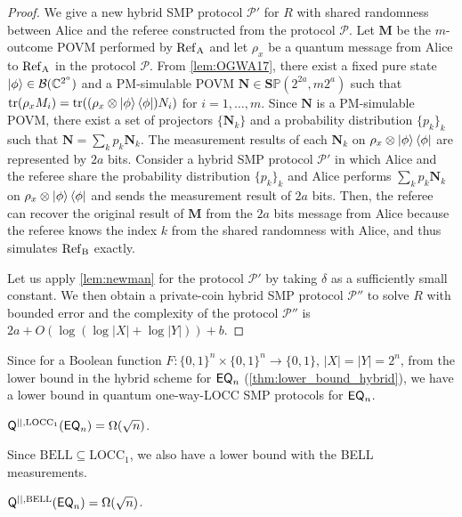 \begin{proof}
    We give a new hybrid SMP protocol $\mathcal{P}'$ for $R$ with shared randomness between Alice and the referee constructed from the protocol $\mathcal{P}$. Let $\mathbf{M}$ be the $m$-outcome POVM performed by $\rm{Ref}_A$ and let $\rho_x$ be a quantum message from Alice to $\rm{Ref}_A$ in the protocol $\mathcal{P}$. From \cref{lem:OGWA17}, there exist a fixed pure state $\ket{\phi} \in \mathcal{B}(\mathbb{C}^{2^a})$ and a PM-simulable POVM $\mathbf{N} \in \mathbf{S}\mathbb{P}(2^{2a},m 2^a)$ such that $\mathrm{tr}(\rho_x M_i) = \mathrm{tr}((\rho_x \otimes \ket{\phi} \bra{\phi}) N_i)$ for $i=1,\ldots,m$. Since $\mathbf{N}$ is a PM-simulable POVM, there exist a set of projectors $\{\mathbf{N}_k\}$ and a probability distribution $\{p_k\}_k$ such that $\mathbf{N} = \sum_k p_k \mathbf{N}_k$. The measurement results of each $\mathbf{N}_k$ on $\rho_x \otimes \ket{\phi} \bra{\phi}$ are represented by $2a$ bits. Consider a hybrid SMP protocol $\mathcal{P}'$ in which Alice and the referee share the probability distribution $\{p_k\}_k$ and Alice performs $\sum_k p_k \mathbf{N}_k$ on $\rho_x \otimes \ket{\phi}\bra{\phi}$ and sends the measurement result of $2a$ bits. Then, the referee can recover the original result of $\mathbf{M}$ from the $2a$ bits message from Alice because the referee knows the index $k$ from the shared randomness with Alice, and thus simulates $\rm{Ref}_B$ exactly.
    
    Let us apply \cref{lem:newman} for the protocol $\mathcal{P}'$ by taking $\delta$ as a sufficiently small constant. We then obtain a private-coin hybrid SMP protocol $\mathcal{P}''$ to solve $R$ with bounded error and the complexity of the protocol $\mathcal{P}''$ is $2a + O(\log (\log |X| + \log |Y|)) + b$.
\end{proof}

Since for a Boolean function $F:\{0,1\}^n \times \{0,1\}^n \rightarrow \{0,1\}$, $|X|=|Y| = 2^n$, from the lower bound in the hybrid scheme for $\mathsf{EQ}_n$ (\cref{thm:lower_bound_hybrid}), we have a lower bound in quantum one-way-LOCC SMP protocols for $\mathsf{EQ}_n$.

\begin{corollary}\label{cor:EQ}
    $\mathsf{Q}^{||,\mathrm{LOCC}_1}(\mathsf{EQ}_n) = \Omega(\sqrt{n})$.
\end{corollary}

Since $\mathrm{BELL} \subseteq \mathrm{LOCC_1}$, we also have a lower bound with the BELL measurements.

\begin{corollary}
    $\mathsf{Q}^{||,\mathrm{BELL}}(\mathsf{EQ}_n) = \Omega(\sqrt{n})$.
\end{corollary}

